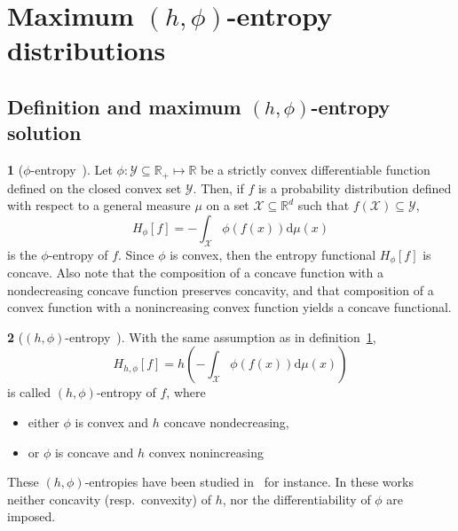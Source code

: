 \documentclass[english,sort&compress]{elsarticle}
\theoremstyle{definition}
\newtheorem{defn}{\protect\definitionname}
\theoremstyle{plain}
\theoremstyle{plain}
\providecommand{\definitionname}{Definition}
\def\dmu{\mathrm{d}\mu}
\def\Rset{\mathbb{R}}
\def\X{\mathcal{X}}
\def\Y{\mathcal{Y}}
\begin{document}

\section{Maximum $(h,\phi)$-entropy distributions}
\label{sec:MaxPhiEnt}



\subsection{Definition and maximum $(h,\phi)$-entropy solution}
\label{subsec:DefinitionPhiEnt}

\begin{defn}[$\phi$-entropy~\cite{Csi67, SalMen93, Sal94}]
\label{def:phi-entropy}
Let  $\phi:   \Y  \subseteq  \Rset_+   \mapsto  \Rset$  be  a   strictly  convex
differentiable function defined on the closed  convex set $\Y$.  Then, if $f$ is
a probability distribution defined with respect  to a general measure $\mu$ on a
set $\X \subseteq \Rset^d$ such that $f(\X) \subseteq \Y$,
  \begin{equation}\label{eq:phi-entropy}
    H_\phi[f] = - \int_\X \phi(f(x)) \dmu(x)
  \end{equation}
  is  the $\phi$-entropy  of  $f$.  Since  $\phi$  is convex,  then the  entropy
  functional  $H_\phi[f]$ is  concave.   Also  note that  the  composition of  a
  concave function  with a  nondecreasing concave function  preserves concavity,
  and that composition of a convex function with a nonincreasing convex function
  yields a concave functional.
\end{defn}

\begin{defn}[$(h,\phi)$-entropy~\cite{Csi67, SalMen93, Sal94}]
\label{def:h_phi-entropy}
  With the same assumption as in definition~\ref{def:phi-entropy},
  \begin{equation}\label{eq:h-phi-entropy}
    H_{h,\phi}[f] = h\left( - \int_\X \phi(f(x)) \dmu(x) \right)
  \end{equation}
  is called $(h,\phi)$-entropy of $f$, where
  \begin{itemize}
  \item either $\phi$ is convex and $h$ concave nondecreasing,
  \item or $\phi$ is concave and $h$ convex nonincreasing
  \end{itemize}
\end{defn}
%
These $(h,\phi)$-entropies have been studied in~\cite{SalMen93, Sal94, MenMor97}
for instance.  In  these works neither concavity (resp.\  convexity) of $h$, nor
the differentiability of $\phi$ are imposed.
\end{document}
